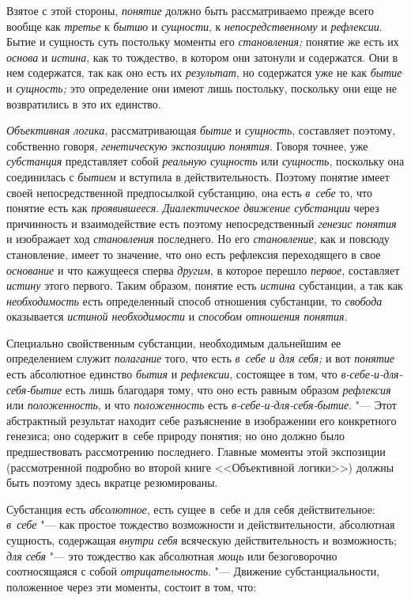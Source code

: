 Взятое с этой стороны, {\em понятие} должно быть рассматриваемо прежде всего
вообще как {\em третье} к {\em бытию} и {\em сущности}, к
{\em непосредственному} и {\em рефлексии}. Бытие и сущность суть постольку
моменты его {\em становления;} понятие же есть их {\em основа} и
{\em истина}, как то тождество, в котором они затонули и содержатся. Они в
нем содержатся, так как оно есть их {\em результат}, но содержатся уже не
как {\em бытие} и {\em сущность;} это определение они имеют лишь постольку,
поскольку они еще не возвратились в это их единство.

{\em Объективная логика}, рассматривающая {\em бытие} и {\em сущность},
составляет поэтому, собственно говоря, {\em генетическую экспозицию понятия}.
Говоря точнее, уже {\em субстанция} представляет собой {\em реальную сущность}
или {\em сущность}, поскольку она соединилась с {\em бытием} и вступила в
действительность. Поэтому понятие имеет своей непосредственной предпосылкой
субстанцию, она есть {\em в~себе} то, что понятие есть как {\em проявившееся}.
{\em Диалектическое движение субстанции} через причинность и взаимодействие
есть поэтому непосредственный {\em генезис понятия} и изображает ход
{\em становления} последнего. Но его {\em становление}, как и
повсюду становление, имеет то значение, что оно есть рефлексия переходящего
в свое {\em основание} и что кажущееся сперва {\em другим}, в которое перешло
{\em первое}, составляет {\em истину} этого первого. Таким образом, понятие есть
{\em истина} субстанции, а так как {\em необходимость} есть определенный
способ отношения субстанции, то {\em свобода} оказывается {\em истиной
необходимости} и {\em способом отношения понятия}.

Специально свойственным субстанции, необходимым дальнейшим ее определением
служит {\em полагание} того, что есть {\em в~себе и для себя;} и вот
{\em понятие} есть абсолютное единство {\em бытия} и {\em рефлексии},
состоящее в том, что {\em в-себе-и-для-себя-бытие} есть лишь благодаря тому,
что оно есть равным образом {\em рефлексия} или {\em положенность}, и что
{\em положенность} есть {\em в-себе-и-для-себя-бытие}. "--- Этот абстрактный
результат находит себе разъяснение в изображении его конкретного генезиса;
оно содержит в~себе природу понятия; но оно должно было предшествовать
рассмотрению последнего. Главные моменты этой экспозиции (рассмотренной
подробно во второй книге <<Объективной логики>>) должны быть поэтому здесь
вкратце резюмированы.

Субстанция есть {\em абсолютное}, есть сущее в~себе и для себя
действительное: {\em в~себе} "--- как простое тождество возможности и
действительности, абсолютная сущность, содержащая {\em внутри себя}
всяческую действительность и возможность; {\em для себя} "--- это
тождество как абсолютная {\em мощь} или безоговорочно соотносящаяся с собой
{\em отрицательность}. "--- Движение субстанциальности, положенное через эти
моменты, состоит в том, что:

